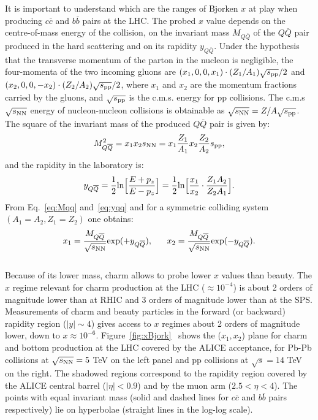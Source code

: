 It is important to understand which are the ranges of Bjorken $x$
at play when producing $c\overline{c}$ and $b\overline{b}$ pairs at the LHC. 
The probed $x$ value depends on the centre-of-mass energy
of the collision, on the invariant mass $M_{Q\overline{Q}}$ of the 
$Q\overline{Q}$ pair produced in the hard scattering
and on its rapidity $y_{Q\overline{Q}}$. Under the hypothesis 
that the transverse momentum of the parton 
in the nucleon is negligible, the four-momenta of the two 
incoming gluons are $(x_1,0,0,x_1)\cdot(Z_1/A_1)\sqrt{s_{\rm pp}}/2$
and $(x_2,0,0,-x_2)\cdot(Z_2/A_2)\sqrt{s_{\rm pp}}/2$, where 
$x_1$ and $x_2$ are the momentum fractions 
carried by the gluons, and $\sqrt{s_{\rm pp}}$ is the c.m.s. energy for pp collisions.
The c.m.s $\sqrt{s_{\rm NN}}$ energy of nucleon-nucleon collisions is obtainable as $\sqrt{s_{\rm NN}}=Z/A\sqrt{s_{\rm pp}}$.
The square of the invariant mass of the produced $Q\overline{Q}$ pair is given by:
\begin{equation}
\label{eq:Mqq}
M_{Q\overline{Q}}^2 =  x_1 x_2 s_{\rm NN} = x_1 \frac{Z_1}{A_1} x_2 \frac{Z_2}{A_2} s_{\rm pp},
\end{equation}
and the rapidity in the laboratory is:
\begin{equation}
\label{eq:yqq}
y_{Q\overline{Q}} = \frac{1}{2} {\rm ln} {\Big [ } \frac{E +p_z}{E-p_z}  {\Big ] }= \frac{1}{2} {\rm ln} {\Big [ } \frac{x_1}{x_2} \cdot \frac{Z_1 A_2}{Z_2 A_1} {\Big ] }.    
\end{equation}
From Eq.~\ref{eq:Mqq} and~\ref{eq:yqq} and for a symmetric colliding system $(A_1 = A_2, Z_1 = Z_2)$
one obtains:
\begin{equation}
\label{eq:x1x2}
x_1 = \frac{M_{Q\overline{Q}}}{\sqrt{s_{\rm NN}}} {\rm exp} (+y_{Q\overline{Q}} ), \; \; \; \; \; \;
x_2 = \frac{M_{Q\overline{Q}}}{\sqrt{s_{\rm NN}}} {\rm exp} (-y_{Q\overline{Q}} ). 
\end{equation}\\




Because of its lower mass, charm allows to probe lower $x$ values than beauty. 
The $x$ regime relevant for charm production at the LHC ($\approx 10^{-4}$) is about 
2 orders of magnitude lower than at RHIC and 3 orders of magnitude lower than at the SPS.
Measurements of charm and beauty particles in the forward (or backward) rapidity region ($|y| \sim 4 $) 
gives access to $x$ regimes about 2 orders of magnitude lower, down to $x \approx 10^{-6}$.
Figure~\ref{fig:xBjork}~\cite{Alessandro:2006yt} shows the ($x_1, x_2$) 
plane for charm and bottom production at the LHC
covered by the ALICE acceptance, for Pb-Pb
collisions at $\sqrt{s_{\rm NN}} = 5$ TeV on the left panel and pp collisions 
at $\sqrt{s} = 14$ TeV on the right.
The shadowed regions correspond to the rapidity region covered 
by the ALICE central barrel ($|\eta| < 0.9$) and by the 
muon arm ($2.5 < \eta < 4$).
The points with equal invariant mass (solid and dashed lines for $c\overline{c}$ and $b\overline{b}$ pairs respectively) 
lie on hyperbolae (straight lines in the log-log scale).\\


